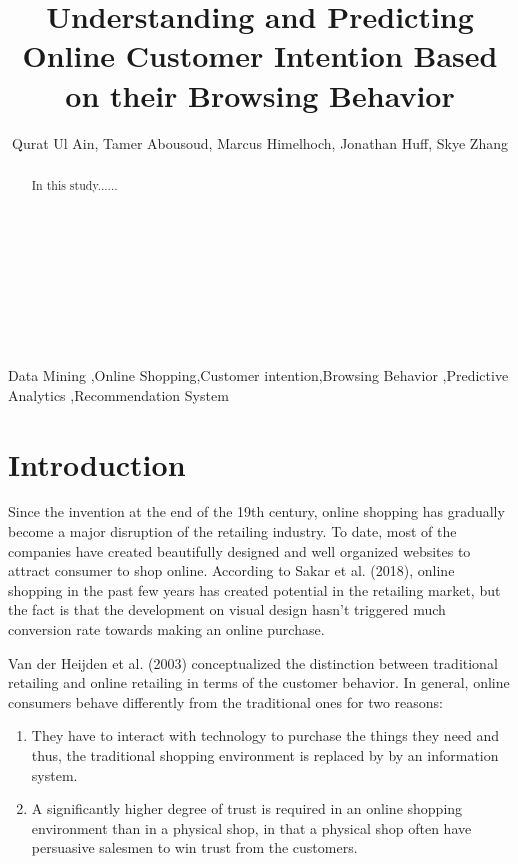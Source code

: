\documentclass[final, 3p,12pt,times,letter,twocolumn]{elsarticle}
\begin{document}

\begin{frontmatter}
\title{Understanding and Predicting Online Customer Intention Based on their Browsing Behavior
}


\author{Qurat Ul Ain, Tamer Abousoud, Marcus Himelhoch, Jonathan Huff, Skye  Zhang}
\address{Graham School of Continuing Liberal and Professional Studies, the University of Chicago}
\begin{abstract}
In this study...... 
\\
\\
\\
\\
\\
\\
\\
\\

\end{abstract}

\begin{keyword}
Data Mining \sep Online Shopping\sep Customer intention\sep Browsing Behavior \sep Predictive Analytics \sep Recommendation System
\end{keyword}

\end{frontmatter}


\section{Introduction}
Since the invention at the end of the 19th century, online shopping has gradually become a major disruption of the retailing industry. To date, most of the companies have created beautifully designed and well organized websites to attract consumer to shop online. According to Sakar et al. (2018), online shopping in the past few years has created potential in the retailing market, but the fact is that the development on visual design hasn't triggered much conversion rate towards making an online purchase.

Van der Heijden et al. (2003) conceptualized the distinction between traditional retailing and online retailing in terms of the customer behavior. In general, online consumers behave differently from the traditional ones for two reasons: 
\begin{enumerate}[(1)]
\item They have to interact with technology to purchase the things they need and thus, the traditional shopping environment is replaced by by an information system.
\item A significantly higher degree of trust is required in an online shopping environment than in a physical shop, in that a physical shop often have persuasive salesmen to win trust from the customers.
\end{enumerate}
\end{document}
